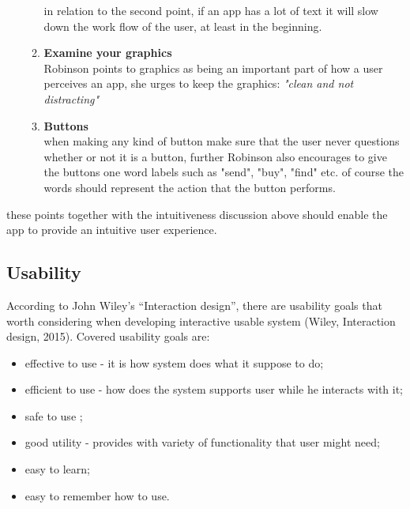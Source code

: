 \begin{itemize}
\begin{enumerate}
 in relation to the second point, if an app has a lot of text it will slow down 
 the work flow of the user, at least in the beginning.
 \item \textbf{Examine your graphics}\\
 Robinson points to graphics as being an important part of how a user perceives 
 an app, she urges to keep the graphics: \textit{"clean and not distracting"} 
 \item \textbf{Buttons}\\
 when making any kind of button make sure that the user never questions whether 
 or not it is a button, further Robinson also encourages to give the buttons one 
 word labels such as "send", "buy", "find" etc. of course the words should 
 represent the action that the button performs.
 \end{enumerate} 
\end{itemize} 
these points together with the intuitiveness discussion above should enable the 
app to provide an intuitive user experience. 

\subsection{Usability}
According to John Wiley’s “Interaction design”, there are usability goals that 
worth considering when developing interactive usable system (Wiley, Interaction 
design, 2015). Covered usability goals are:
\begin{itemize}
\item effective to use - it is how system does what it suppose to do;
\item efficient to use - how does the system supports user while he interacts 	
with it;
\item safe to use ;
\item good utility - provides with variety of functionality that user might need; 
\item easy to learn;
\item easy to remember how to use.
\end{itemize}

